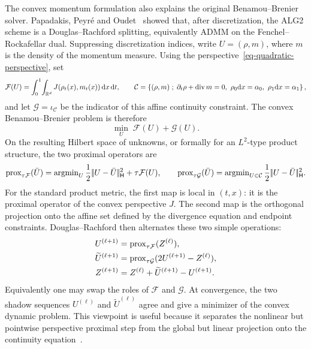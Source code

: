 The convex momentum formulation also explains the original Benamou--Brenier solver. Papadakis, Peyr\'e and Oudet~\cite{FPapPeyOud13} showed that, after discretization, the ALG2 scheme is a Douglas--Rachford splitting, equivalently ADMM on the Fenchel--Rockafellar dual. Suppressing discretization indices, write \(U=(\rho,m)\), where \(m\) is the density of the momentum measure. Using the perspective~\eqref{eq-quadratic-perspective}, set
\[
	\mathcal F(U)=\int_0^1\!\int_{\mathbb{R}^d}J(\rho_t(x),m_t(x))\,\mathrm{d} x\,\mathrm{d} t,
	\qquad
	\mathcal C=\left\{ (\rho,m) \;;\; \partial_t\rho+\operatorname{div} m=0,\ \rho_0\mathrm{d} x=\alpha_0,\ \rho_1\mathrm{d} x=\alpha_1 \right\},
\]
and let $\mathcal G=\iota_{\mathcal C}$ be the indicator of this affine continuity constraint. The convex Benamou--Brenier problem is therefore
\[
	\min_U\; \mathcal F(U)+\mathcal G(U).
\]
On the resulting Hilbert space of unknowns, or formally for an $L^2$-type product structure, the two proximal operators are
\[
	\operatorname{prox}_{\tau\mathcal F}(\bar U)
	=
	\operatorname{argmin}_U
	\frac12|\!| U-\bar U |\!|_{\mathsf H}^2+\tau\mathcal F(U),
	\qquad
	\operatorname{prox}_{\tau\mathcal G}(\bar U)
	=
	\operatorname{argmin}_{U\in\mathcal C}
	\frac12|\!| U-\bar U |\!|_{\mathsf H}^2.
\]
For the standard product metric, the first map is local in $(t,x)$: it is the proximal operator of the convex perspective $J$. The second map is the orthogonal projection onto the affine set defined by the divergence equation and endpoint constraints. Douglas--Rachford then alternates these two simple operations:
\[
	\begin{aligned}
		U^{(\ell+1)} &= \operatorname{prox}_{\tau\mathcal F}(Z^{(\ell)}),\\
		\widetilde U^{(\ell+1)} &= \operatorname{prox}_{\tau\mathcal G}(2U^{(\ell+1)}-Z^{(\ell)}),\\
		Z^{(\ell+1)} &= Z^{(\ell)}+\widetilde U^{(\ell+1)}-U^{(\ell+1)}.
	\end{aligned}
\]
Equivalently one may swap the roles of $\mathcal F$ and $\mathcal G$. At convergence, the two shadow sequences $U^{(\ell)}$ and $\widetilde U^{(\ell)}$ agree and give a minimizer of the convex dynamic problem. This viewpoint is useful because it separates the nonlinear but pointwise perspective proximal step from the global but linear projection onto the continuity equation~\cite{FPapPeyOud13,Eckstein1992}.

